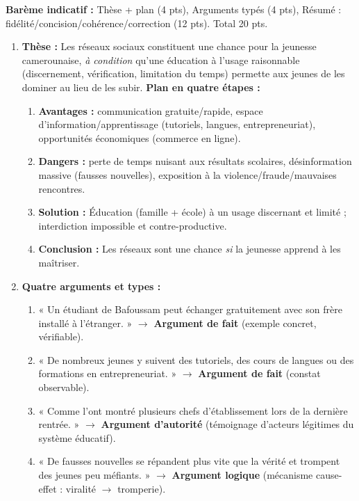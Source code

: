 \documentclass[11pt]{article}
\begin{document}
\begin{corrige}
\textbf{Barème indicatif :} Thèse + plan (4 pts), Arguments typés (4 pts), Résumé : fidélité/concision/cohérence/correction (12 pts). Total 20 pts.

\begin{enumerate}
\item \textbf{Thèse :} Les réseaux sociaux constituent une chance pour la jeunesse camerounaise, \emph{à condition} qu'une éducation à l'usage raisonnable (discernement, vérification, limitation du temps) permette aux jeunes de les dominer au lieu de les subir.
\textbf{Plan en quatre étapes :}
\begin{enumerate}
\item \textbf{Avantages :} communication gratuite/rapide, espace d'information/apprentissage (tutoriels, langues, entrepreneuriat), opportunités économiques (commerce en ligne).
\item \textbf{Dangers :} perte de temps nuisant aux résultats scolaires, désinformation massive (fausses nouvelles), exposition à la violence/fraude/mauvaises rencontres.
\item \textbf{Solution :} Éducation (famille + école) à un usage discernant et limité ; interdiction impossible et contre-productive.
\item \textbf{Conclusion :} Les réseaux sont une chance \emph{si} la jeunesse apprend à les maîtriser.
\end{enumerate}
\item \textbf{Quatre arguments et types :}
\begin{enumerate}
\item « Un étudiant de Bafoussam peut échanger gratuitement avec son frère installé à l'étranger. » $\rightarrow$ \textbf{Argument de fait} (exemple concret, vérifiable).
\item « De nombreux jeunes y suivent des tutoriels, des cours de langues ou des formations en entrepreneuriat. » $\rightarrow$ \textbf{Argument de fait} (constat observable).
\item « Comme l'ont montré plusieurs chefs d'établissement lors de la dernière rentrée. » $\rightarrow$ \textbf{Argument d'autorité} (témoignage d'acteurs légitimes du système éducatif).
\item « De fausses nouvelles se répandent plus vite que la vérité et trompent des jeunes peu méfiants. » $\rightarrow$ \textbf{Argument logique} (mécanisme cause-effet : viralité $\rightarrow$ tromperie).

\end{enumerate}
\end{enumerate}
\end{corrige}
\end{document}
